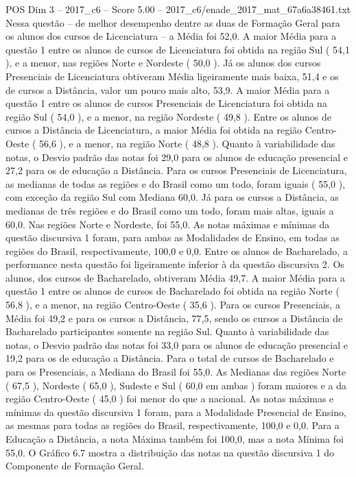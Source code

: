 \begin{textsample}{POS Dim 3 – 2017\_c6 – Score 5.00 – 2017\_c6/enade\_2017\_mat\_67a6a38461.txt}
Nessa questão – de melhor desempenho dentre as duas de Formação Geral para os alunos dos cursos de Licenciatura – a Média foi 52,0.
A maior Média para a questão 1 entre os alunos de cursos de Licenciatura foi obtida na região Sul ( 54,1 ), e a menor, nas regiões Norte e Nordeste ( 50,0 ).
Já os alunos dos cursos Presenciais de Licenciatura obtiveram Média ligeiramente mais baixa, 51,4 e os de cursos a Distância, valor um pouco mais alto, 53,9.
A maior Média para a questão 1 entre os alunos de cursos Presenciais de Licenciatura foi obtida na região Sul ( 54,0 ), e a menor, na região Nordeste ( 49,8 ).
Entre os alunos de cursos a Distância de Licenciatura, a maior Média foi obtida na região Centro-Oeste ( 56,6 ), e a menor, na região Norte ( 48,8 ).
Quanto à variabilidade das notas, o Desvio padrão das notas foi 29,0 para os alunos de educação presencial e 27,2 para os de educação a Distância.
Para os cursos Presenciais de Licenciatura, as medianas de todas as regiões e do Brasil como um todo, foram iguais ( 55,0 ), com exceção da região Sul com Mediana 60,0.
Já para os cursos a Distância, as medianas de três regiões e do Brasil como um todo, foram mais altas, iguais a 60,0.
Nas regiões Norte e Nordeste, foi 55,0.
As notas máximas e mínimas da questão discursiva 1 foram, para ambas as Modalidades de Ensino, em todas as regiões do Brasil, respectivamente, 100,0 e 0,0.
Entre os alunos de Bacharelado, a performance nesta questão foi ligeiramente inferior à da questão discursiva 2.
Os alunos, dos cursos de Bacharelado, obtiveram Média 49,7.
A maior Média para a questão 1 entre os alunos de cursos de Bacharelado foi obtida na região Norte ( 56,8 ), e a menor, na região Centro-Oeste ( 35,6 ).
Para os cursos Presenciais, a Média foi 49,2 e para os cursos a Distância, 77,5, sendo os cursos a Distância de Bacharelado participantes somente na região Sul.
Quanto à variabilidade das notas, o Desvio padrão das notas foi 33,0 para os alunos de educação presencial e 19,2 para os de educação a Distância.
Para o total de cursos de Bacharelado e para os Presenciais, a Mediana do Brasil foi 55,0.
As Medianas das regiões Norte ( 67,5 ), Nordeste ( 65,0 ), Sudeste e Sul ( 60,0 em ambas ) foram maiores e a da região Centro-Oeste ( 45,0 ) foi menor do que a nacional.
As notas máximas e mínimas da questão discursiva 1 foram, para a Modalidade Presencial de Ensino, as mesmas para todas as regiões do Brasil, respectivamente, 100,0 e 0,0.
Para a Educação a Distância, a nota Máxima também foi 100,0, mas a nota Mínima foi 55,0.
O Gráfico 6.7 mostra a distribuição das notas na questão discursiva 1 do Componente de Formação Geral.

\end{textsample}
